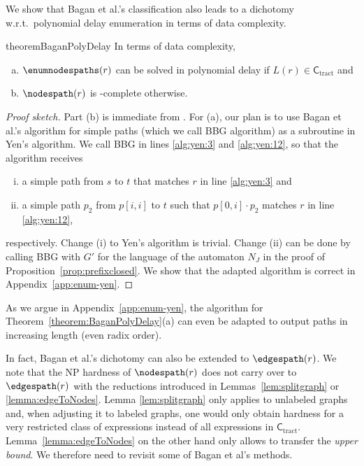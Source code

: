 \documentclass[a4paper,english]{lipics-v2016}
\newcommand{\ctract}{\ensuremath{\textsf{C}_\text{tract}}\xspace}
\theoremstyle{plain}
\begin{document}
We show that Bagan et al.'s classification also leads to a dichotomy
w.r.t.\  polynomial delay enumeration in terms of data complexity.
\begin{restatable}{theorem}{BaganPolyDelay} \label{theorem:BaganPolyDelay}
  In terms of data complexity, 
  \begin{enumerate}[(a)]
  \item $\enumnodespaths(r)$ can be solved in polynomial delay if $L(r) \in \ctract$ and
  \item $\nodespath(r)$ is \np-complete otherwise.
  \end{enumerate}
\end{restatable}
\begin{proof}[Proof sketch]
  Part (b) is immediate from \cite[Theorem 1]{bagan}. For (a), our
  plan is to use Bagan et al.'s algorithm for simple paths (which we
  call BBG algorithm) as a subroutine in Yen's algorithm. We call BBG
  in lines \ref{alg:yen:3} and \ref{alg:yen:12}, so that the algorithm
  receives
  \begin{enumerate}[(i)]
  \item a simple path from $s$ to $t$ that matches $r$ in line
    \ref{alg:yen:3} and
  \item a simple path $p_2$ from $p[i,i]$ to $t$ such that
    $p[0,i]\cdot p_2$ matches $r$ in line \ref{alg:yen:12},
  \end{enumerate}
  respectively.   Change (i) to Yen's algorithm is trivial. Change (ii) can be done by
  calling BBG with $G'$ for the language of the automaton $N_J$ in the
  proof of Proposition~\ref{prop:prefixclosed}. We show that the
  adapted algorithm is correct in Appendix~\ref{app:enum-yen}.
\end{proof}
As we argue in Appendix~\ref{app:enum-yen}, the algorithm for Theorem~\ref{theorem:BaganPolyDelay}(a) can even be
adapted to output paths in increasing length (even radix order).


In fact, Bagan et al.'s dichotomy can also be extended to
$\edgespath(r)$. 
We note that the NP hardness of $\nodespath(r)$ does not carry over to
$\edgespath(r)$ with the reductions introduced in
Lemmas~\ref{lem:splitgraph} or \ref{lemma:edgeToNodes}. Lemma \ref{lem:splitgraph} only applies to
unlabeled graphs and, when adjusting it to labeled graphs, one would
only obtain hardness for a very restricted class of expressions
instead of all expressions in
\ctract. Lemma~\ref{lemma:edgeToNodes} on the other hand only allows to transfer
the \emph{upper bound}. We therefore need to revisit some of Bagan et al's methods.
\end{document}
